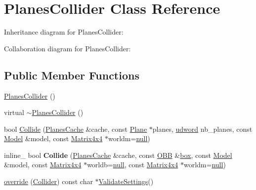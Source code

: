 \hypertarget{class_planes_collider}{\section{Planes\+Collider Class Reference}
\label{class_planes_collider}
}


Inheritance diagram for Planes\+Collider\+:


Collaboration diagram for Planes\+Collider\+:
\subsection*{Public Member Functions}
\begin{DoxyCompactItemize}
\item 
\hyperlink{class_planes_collider_a85d977a4cffea432c5dd82861eb96dfb}{Planes\+Collider} ()
\item 
virtual \hyperlink{class_planes_collider_a497b9251065bc7b3ebf4a2ec9e23d52d}{$\sim$\+Planes\+Collider} ()
\item 
bool \hyperlink{class_planes_collider_aa5a7c2fb04b8842f5df317dfc3c15df6}{Collide} (\hyperlink{struct_planes_cache}{Planes\+Cache} \&cache, const \hyperlink{class_plane}{Plane} $\ast$planes, \hyperlink{_ice_types_8h_a44c6f1920ba5551225fb534f9d1a1733}{udword} nb\+\_\+planes, const \hyperlink{class_model}{Model} \&model, const \hyperlink{class_matrix4x4}{Matrix4x4} $\ast$worldm=\hyperlink{_ice_types_8h_ac97b8ee753e4405397a42ad5799b0f9e}{null})
\item 
\hypertarget{class_planes_collider_ae87b837a86f69b493a507333ed2f81dc}{inline\+\_\+ bool {\bfseries Collide} (\hyperlink{struct_planes_cache}{Planes\+Cache} \&cache, const \hyperlink{class_o_b_b}{O\+B\+B} \&\hyperlink{structbox}{box}, const \hyperlink{class_model}{Model} \&model, const \hyperlink{class_matrix4x4}{Matrix4x4} $\ast$worldb=\hyperlink{_ice_types_8h_ac97b8ee753e4405397a42ad5799b0f9e}{null}, const \hyperlink{class_matrix4x4}{Matrix4x4} $\ast$worldm=\hyperlink{_ice_types_8h_ac97b8ee753e4405397a42ad5799b0f9e}{null})}\label{class_planes_collider_ae87b837a86f69b493a507333ed2f81dc}

\item 
\hyperlink{class_planes_collider_a1d94337aeabee2429274f5c333d08dfa}{override} (\hyperlink{class_collider}{Collider}) const char $\ast$\hyperlink{class_collider_a225d4861b2184336433894174c6e3e2d}{Validate\+Settings}()
\end{DoxyCompactItemize}
